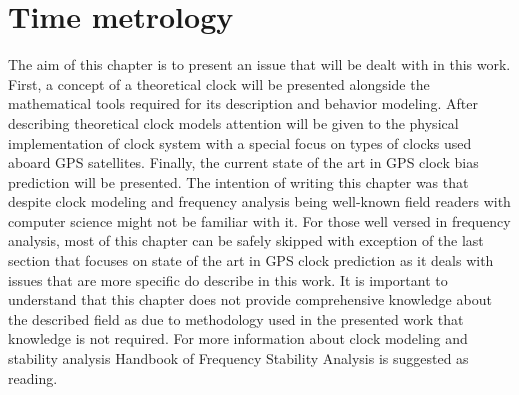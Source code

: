 \FloatBarrier
\chapter{Time metrology}

The aim of this chapter is to present an issue that will be dealt with in this work.
First, a concept of a theoretical clock will be presented alongside the mathematical tools 
required for its description and behavior modeling.
After describing theoretical clock models attention will be given to the physical implementation
of clock system with a special focus on types of clocks used aboard GPS satellites.
Finally, the current state of the art in GPS clock bias prediction will be presented.
The intention of writing this chapter was that despite clock modeling and frequency analysis being
well-known field readers with computer science might not be familiar with it.
For those well versed in frequency analysis, most of this chapter can be safely skipped with
exception of the last section that focuses on state of the art in GPS clock prediction as it
deals with issues that are more specific do describe in this work.
It is important to understand that this chapter does not provide comprehensive knowledge about
the described field as due to methodology used in the presented work 
that knowledge is not required.
For more information about clock modeling and stability analysis Handbook of Frequency Stability
Analysis is suggested as reading.
